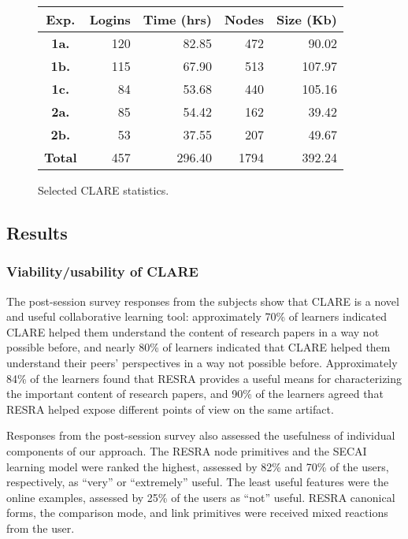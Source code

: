 \begin{figure}[htb]
  \begin{center}
  \begin{tabular} {|c|r|r|r|r|} \hline   
    Exp. & Logins & Time (hrs)& Nodes & Size (Kb) \\
    \hline \hline {\bf 1a.}  & 120 & 82.85 & 472 & 90.02 \\ \hline {\bf
    1b.}  & 115 & 67.90 & 513 & 107.97 \\ \hline {\bf 1c.}  & 84 &
    53.68 & 440 & 105.16 \\ \hline {\bf 2a.}  & 85 & 54.42 & 162 &
    39.42 \\ \hline {\bf 2b.}  & 53 & 37.55 & 207 & 49.67 \\ \hline
    \hline {\bf Total} & 457 & 296.40 & 1794 & 392.24 \\ \hline
   \end{tabular}
  \end{center}
    \caption{Selected CLARE statistics.}
   \label{tab:summary-stat}
\end{figure}


\subsection{Results}
\label{sec:results}

\subsubsection{Viability/usability of CLARE}

The post-session survey responses from the subjects show that CLARE is a
novel and useful collaborative learning tool: approximately 70\% of
learners indicated CLARE helped them understand the content of research
papers in a way not possible before, and nearly 80\% of learners indicated
that CLARE helped them understand their peers' perspectives in a way not
possible before. Approximately 84\% of the learners found that RESRA
provides a useful means for characterizing the important content of
research papers, and 90\% of the learners agreed that RESRA helped expose
different points of view on the same artifact.

Responses from the post-session survey also assessed the usefulness of
individual components of our approach. The RESRA node primitives and the
SECAI learning model were ranked the highest, assessed by 82\% and 70\% of
the users, respectively, as ``very'' or ``extremely'' useful. The least
useful features were the online examples, assessed by 25\% of the users as
``not'' useful. RESRA canonical forms, the comparison mode, and link
primitives were received mixed reactions from the user.

